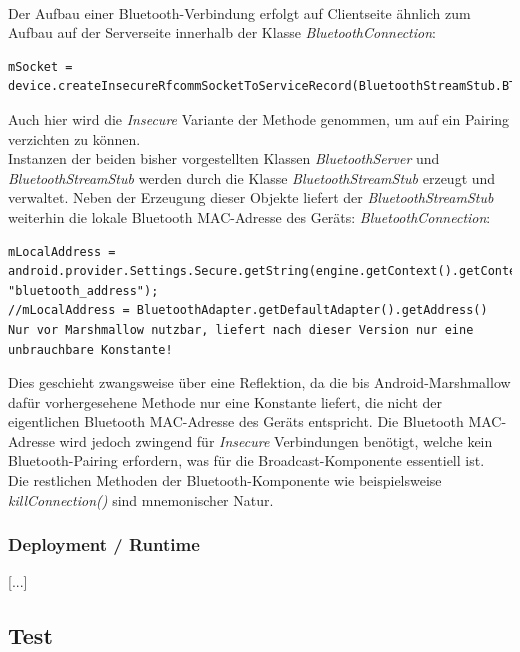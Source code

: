 \\Der Aufbau einer Bluetooth-Verbindung erfolgt auf Clientseite ähnlich zum Aufbau auf der Serverseite innerhalb der Klasse \textit{BluetoothConnection}:
 \lstset{language=Java, caption=Clientseitige Initialisierung des Sockets, label=DescriptiveLabel, numbers=left, numbersep=1em, breaklines=true, basicstyle=\small}
\begin{lstlisting}
mSocket = device.createInsecureRfcommSocketToServiceRecord(BluetoothStreamStub.BT_UUID)
\end{lstlisting}
Auch hier wird die \textit{Insecure} Variante der Methode genommen, um auf ein Pairing verzichten zu können.
\\Instanzen der beiden bisher vorgestellten Klassen \textit{BluetoothServer} und \textit{BluetoothStreamStub} werden durch die Klasse \textit{BluetoothStreamStub} erzeugt und verwaltet. Neben der Erzeugung dieser Objekte liefert der \textit{BluetoothStreamStub} weiterhin die lokale Bluetooth MAC-Adresse des Geräts:
\textit{BluetoothConnection}:
\lstset{language=Java, caption=Auslesen der Bluetooth MAC-Adresse, label=DescriptiveLabel, numbers=left, numbersep=1em, breaklines=true, basicstyle=\small}
\begin{lstlisting}
mLocalAddress = android.provider.Settings.Secure.getString(engine.getContext().getContentResolver(), "bluetooth_address");
//mLocalAddress = BluetoothAdapter.getDefaultAdapter().getAddress() Nur vor Marshmallow nutzbar, liefert nach dieser Version nur eine unbrauchbare Konstante!
\end{lstlisting}
Dies geschieht zwangsweise über eine Reflektion, da die bis Android-Marshmallow dafür vorhergesehene Methode nur eine Konstante liefert, die nicht der eigentlichen Bluetooth MAC-Adresse des Geräts entspricht. Die Bluetooth MAC-Adresse wird jedoch zwingend für \textit{Insecure} Verbindungen benötigt, welche kein Bluetooth-Pairing erfordern, was für die Broadcast-Komponente essentiell ist. 
\\Die restlichen Methoden der Bluetooth-Komponente wie beispielsweise \textit{killConnection()} sind mnemonischer Natur.

\subsubsection{Deployment / Runtime}
[...]


\subsection{Test}
